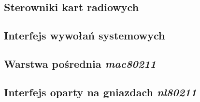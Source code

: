 %
\subsection{Sterowniki kart radiowych}
\subsection{Interfejs wywołań systemowych}
\subsection{Warstwa pośrednia \emph{mac80211}}
\subsection{Interfejs oparty na gniazdach \emph{nl80211}}
